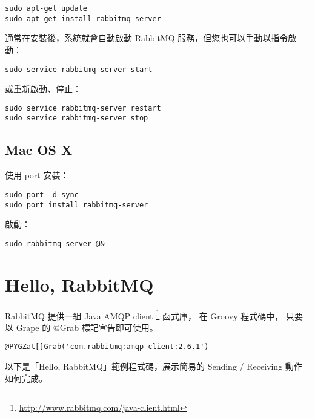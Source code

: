 \documentclass[a4paper,12pt,english]{sphinxmanual}
\begin{document}
\begin{Verbatim}[commandchars=@\[\]]
sudo apt-get update
sudo apt-get install rabbitmq-server
\end{Verbatim}

通常在安裝後，系統就會自動啟動 RabbitMQ 服務，但您也可以手動以指令啟動：

\begin{Verbatim}[commandchars=@\[\]]
sudo service rabbitmq-server start
\end{Verbatim}

或重新啟動、停止：

\begin{Verbatim}[commandchars=@\[\]]
sudo service rabbitmq-server restart
sudo service rabbitmq-server stop
\end{Verbatim}


\subsection{Mac OS X}
\label{rabbitmq:mac-os-x}
使用 port 安裝：

\begin{Verbatim}[commandchars=@\[\]]
sudo port -d sync
sudo port install rabbitmq-server
\end{Verbatim}

啟動：

\begin{Verbatim}[commandchars=@\[\]]
sudo rabbitmq-server @&
\end{Verbatim}


\section{Hello, RabbitMQ}
\label{rabbitmq:hello-rabbitmq}
RabbitMQ 提供一組 Java AMQP client \footnote{
\href{http://www.rabbitmq.com/java-client.html}{http://www.rabbitmq.com/java-client.html}
} 函式庫，
在 Groovy 程式碼中，
只要以 Grape 的 @Grab 標記宣告即可使用。

\begin{Verbatim}[commandchars=@\[\]]
@PYGZat[]Grab('com.rabbitmq:amqp-client:2.6.1')
\end{Verbatim}

以下是「Hello, RabbitMQ」範例程式碼，展示簡易的 Sending / Receiving 動作如何完成。
\end{document}
